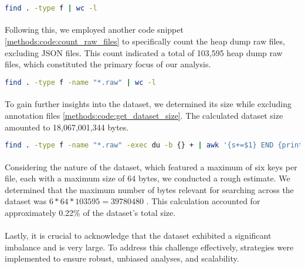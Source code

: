         \begin{lstlisting}[caption={Count all dataset files}, label=methods:code:count_all_dataset_files, language=bash]
        find . -type f | wc -l
        \end{lstlisting}

        \paragraph{}Following this, we employed another code snippet \ref{methods:code:count_raw_files} to specifically count the heap dump raw files, excluding JSON files. This count indicated a total of 103,595 heap dump raw files, which constituted the primary focus of our analysis.

        \begin{lstlisting}[caption={Count heap dump raw dataset files}, label=methods:code:count_raw_files, language=bash]
        find . -type f -name "*.raw" | wc -l
        \end{lstlisting}

        \paragraph*{}To gain further insights into the dataset, we determined its size while excluding annotation files \ref{methods:code:get_dataset_size}. The calculated dataset size amounted to 18,067,001,344 bytes.

        \begin{lstlisting}[caption={Get the size of the dataset}, label=methods:code:get_dataset_size, language=bash]
        find . -type f -name "*.raw" -exec du -b {} + | awk '{s+=$1} END {print s}'
        \end{lstlisting}

        \paragraph{}Considering the nature of the dataset, which featured a maximum of six keys per file, each with a maximum size of 64 bytes, we conducted a rough estimate. We determined that the maximum number of bytes relevant for searching across the dataset was $6 * 64 * 103595 = 39 780 480$ . This calculation accounted for approximately 0.22\% of the dataset's total size.

        \paragraph{}Lastly, it is crucial to acknowledge that the dataset exhibited a significant imbalance and is very large. To address this challenge effectively, strategies were implemented to ensure robust, unbiased analyses, and scalability.
